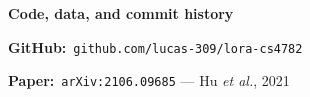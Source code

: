 \documentclass[landscape]{article}
\begin{document}
\begin{minipage}[t]{0.323\textwidth}
\vspace{3mm}
\begin{darkbox}
\color{paper}
{\fontsize{20pt}{24pt}\selectfont\bfseries Code, data, and commit history}\par
\vspace{2mm}
{\fontsize{16pt}{20pt}\selectfont
\textbf{GitHub:}\ \texttt{github.com/lucas-309/lora-cs4782}\par
\vspace{1mm}
\textbf{Paper:}\ \texttt{arXiv:2106.09685} --- Hu \emph{et al.}, 2021}
\end{darkbox}

\end{minipage}
\end{document}
